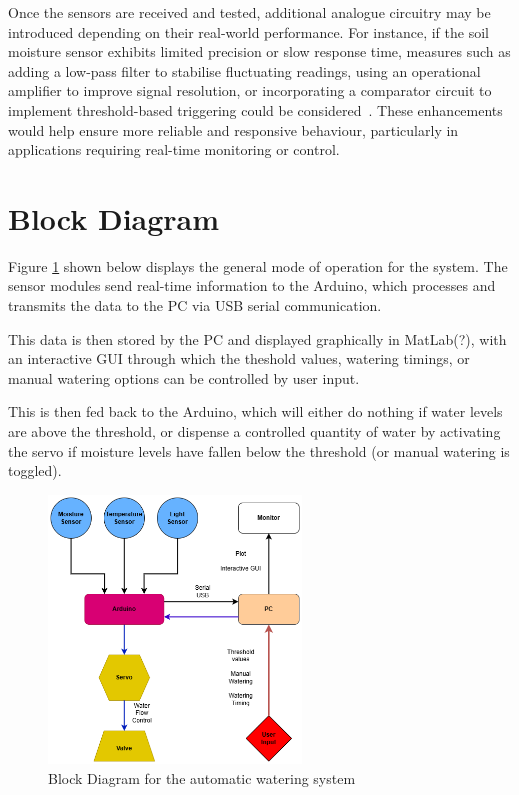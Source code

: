 \documentclass[a4paper,11pt]{article}
\begin{document}
Once the sensors are received and tested, additional analogue circuitry may be introduced depending on their real-world performance. For instance, 
if the soil moisture sensor exhibits limited precision or slow response time, measures such as adding a low-pass filter to stabilise fluctuating readings, 
using an operational amplifier to improve signal resolution, or incorporating a comparator circuit to implement threshold-based triggering could be considered~\cite{dfrobot,yt}. 
These enhancements would help ensure more reliable and responsive behaviour, particularly in applications requiring real-time monitoring or control.


\section{Block Diagram}
\label{sec:Block_Diagram}

Figure \ref{fig:Block_Diagram_for_the_automatic_watering_system}
shown below displays the general mode of operation for the system.
The sensor modules send real-time information to the Arduino,
which processes and transmits the data to the PC via USB serial communication.

This data is then stored by the PC and displayed graphically in MatLab(?), 
with an interactive GUI through which the 
theshold values, watering timings, or manual watering options
can be controlled by user input.

This is then fed back to the Arduino, 
which will either do nothing if water levels are above the threshold,
or dispense a controlled quantity of water by activating the servo
if moisture levels have fallen below the threshold
(or manual watering is toggled).

\begin{figure}[H]
    \centering
    \includegraphics[width=0.6\textwidth]{DataLogger Block Diagram2.png}
    \caption{Block Diagram for the automatic watering system}
    \label{fig:Block_Diagram_for_the_automatic_watering_system}
\end{figure}
\end{document}
